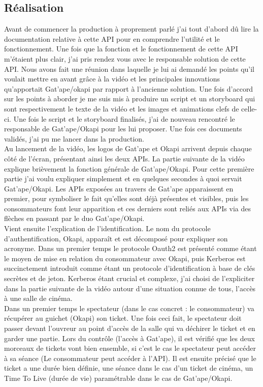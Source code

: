 \subsection{Réalisation}
Avant de commencer la production à proprement parlé j'ai tout d'abord dû lire la documentation relative à cette API pour en comprendre l'utilité et le fonctionnement. Une fois que la fonction et le fonctionnement de cette API m'étaient plus clair, j'ai pris rendez vous avec le responsable solution de cette API. Nous avons fait une réunion dans laquelle je lui ai demandé les points qu'il voulait mettre en avant grâce à la vidéo et les principales innovations qu'apportait Gat'ape/okapi par rapport à l'ancienne solution. Une fois d'accord sur les points à aborder je me suis mis à produire un script et un storyboard qui sont respectivement le texte de la vidéo et les images et animations clefs de celle-ci. Une fois le script et le storyboard finalisés, j'ai de nouveau rencontré le responsable de Gat'ape/Okapi pour les lui proposer. Une fois ces documents validés, j'ai pu me lancer dans la production. \\

Au lancement de la vidéo, les logos de Gat'ape et Okapi arrivent depuis chaque côté de l'écran, présentant ainsi les deux APIs. La partie suivante de la vidéo explique brièvement la fonction générale de Gat'ape/Okapi. Pour cette première partie j'ai voulu expliquer simplement et en quelques secondes à quoi servait Gat'ape/Okapi. Les APIs exposées au travers de Gat'ape apparaissent en premier, pour symboliser le fait qu'elles sont déjà présentes et visibles, puis les consommateurs font leur apparition et ces derniers sont reliés aux APIs via des flèches en passant par le duo Gat'ape/Okapi.\\

Vient ensuite l'explication de l'identification. Le nom du protocole d'authentification, Okapi, apparaît et est décomposé pour expliquer son acronyme. Dans un premier temps le protocole Oauth2 est présenté comme étant le moyen de mise en relation du consommateur avec Okapi,  puis Kerberos est succinctement introduit comme étant un protocole d'identification à base de clés secrètes et de jeton. Kerberos étant crucial et complexe, j'ai choisi de l'expliciter dans la partie suivante de la vidéo autour d'une situation connue de tous, l'accès à une salle de cinéma.\\

Dans un premier temps le spectateur (dans le cas concret : le consommateur) va récupérer au guichet (Okapi) son ticket. Une fois ceci fait, le spectateur doit passer devant l'ouvreur au point d'accès de la salle qui va déchirer le ticket et en garder une partie. Lors du contrôle (l'accès à Gat'ape), il est vérifié que les deux morceaux de tickets vont bien ensemble, si c'est le cas le spectateur peut accéder à sa séance (Le consommateur peut accéder à l'API). Il est ensuite précisé que le ticket a une durée bien définie, une séance dans le cas d'un ticket de cinéma, un Time To Live (durée de vie) paramétrable dans le cas de Gat'ape/Okapi.\\

